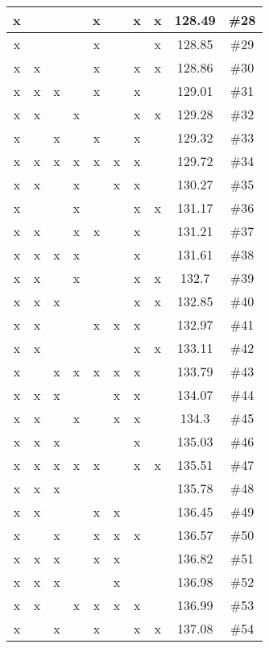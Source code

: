 \begin{center}
\begin{longtable}{|c|c|c|c|c|c|c|c|c|c|}
 x &  &  &  &  x &  &  x &  x & 128.49 & \#28 \\ \hline
 x &  &  &  &  x &  &  &  x & 128.85 & \#29 \\ \hline
 x &  x &  &  &  x &  &  x &  x & 128.86 & \#30 \\ \hline
 x &  x &  x &  &  x &  &  x &  & 129.01 & \#31 \\ \hline
 x &  x &  &  x &  &  &  x &  x & 129.28 & \#32 \\ \hline
 x &  &  x &  &  x &  &  x &  & 129.32 & \#33 \\ \hline
 x &  x &  x &  x &  x &  x &  x &  & 129.72 & \#34 \\ \hline
 x &  x &  &  x &  &  x &  x &  & 130.27 & \#35 \\ \hline
 x &  &  &  x &  &  &  x &  x & 131.17 & \#36 \\ \hline
 x &  x &  &  x &  x &  &  x &  & 131.21 & \#37 \\ \hline
 x &  x &  x &  x &  &  &  x &  & 131.61 & \#38 \\ \hline
 x &  x &  &  x &  &  &  x &  x & 132.7 & \#39 \\ \hline
 x &  x &  x &  &  &  &  x &  x & 132.85 & \#40 \\ \hline
 x &  x &  &  &  x &  x &  x &  & 132.97 & \#41 \\ \hline
 x &  x &  &  &  &  &  x &  x & 133.11 & \#42 \\ \hline
 x &  &  x &  x &  x &  x &  x &  & 133.79 & \#43 \\ \hline
 x &  x &  x &  &  &  x &  x &  & 134.07 & \#44 \\ \hline
 x &  x &  &  x &  &  x &  x &  & 134.3 & \#45 \\ \hline
 x &  x &  x &  &  &  &  x &  & 135.03 & \#46 \\ \hline
 x &  x &  x &  x &  x &  &  x &  x & 135.51 & \#47 \\ \hline
 x &  x &  x &  &  &  &  &  & 135.78 & \#48 \\ \hline
 x &  x &  &  &  x &  x &  &  & 136.45 & \#49 \\ \hline
 x &  &  x &  &  x &  x &  x &  & 136.57 & \#50 \\ \hline
 x &  x &  x &  &  x &  x &  &  & 136.82 & \#51 \\ \hline
 x &  x &  x &  &  &  x &  &  & 136.98 & \#52 \\ \hline
 x &  x &  &  x &  x &  x &  x &  & 136.99 & \#53 \\ \hline
 x &  &  x &  &  x &  &  x &  x & 137.08 & \#54 \\ \hline

\end{longtable}
\end{center}
